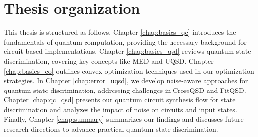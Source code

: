 \section{Thesis organization}
This thesis is structured as follows.
Chapter \ref{chap:basics_qc} introduces the fundamentals of quantum computation,
providing the necessary background for circuit-based implementations.
Chapter \ref{chap:basics_qsd} reviews quantum state discrimination, covering
key concepts like MED and UQSD.
Chapter \ref{chap:basics_co} outlines convex optimization techniques used in
our optimization strategies.
In Chapter \ref{chap:error_uqsd}, we develop noise-aware approaches for
quantum state discrimination, addressing challenges in CrossQSD and FitQSD.
Chapter \ref{chap:qc_qsd} presents our quantum circuit synthesis flow for
state discrimination and analyzes the impact of noise on circuits and input states.
Finally, Chapter \ref{chap:summary} summarizes our findings and discusses
future research directions to advance practical quantum state discrimination.
